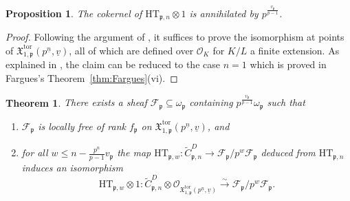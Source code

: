 \documentclass[11pt]{amsart}
\theoremstyle{definition} %
\theoremstyle{plain} %
\newtheorem{theorem}[definition]{Theorem}
\newtheorem{proposition}[definition]{Proposition}
\theoremstyle{remark} %
\newcommand{\cF}{{\mathcal F}}
\newcommand{\cO}{{\mathcal O}}
\newcommand{\frakX}{\mathfrak X}
\newcommand{\frakp}{\mathfrak p}
\newcommand{\HT}{\mathrm{HT}}
\newcommand{\tor}{\mathrm{tor}} %
\begin{document}
\begin{proposition} \label{prop:cokerHT}
    The cokernel of $\HT_{\frakp,n}\otimes 1$
     is annihilated  by $p^\frac{v_\frakp}{p-1}$.
\end{proposition}
\begin{proof}
Following the argument of \cite[Prop.~4.2.2]{AIP_Siegel},
it suffices to prove the isomorphism at points of $\frakX_{1,\frakp}^\tor(p^{\underline{n}},\underline{v})$,
all of which are defined over $\cO_K$ for $K/L$ a finite extension.
As explained in \cite[Prop.~3.2.1]{AIP_Siegel}, the claim can be reduced to the case $n=1$ which is proved in Fargues's Theorem~\ref{thm:Fargues}(vi).
\end{proof}

\begin{theorem}
There exists a sheaf $\cF_\frakp\subseteq \omega_\frakp$  containing $p^{\frac{v_\frakp}{p-1}}\omega_\frakp$ such that
\begin{enumerate}
    \item $\cF_\frakp$ is locally free of rank $f_\frakp$ on $\frakX_{1,\frakp}^\tor(p^{\underline{n}},\underline{v})$, and 
    \item  for all $w\leqslant n-\frac{p^n}{p-1}v_\frakp$ the  map
$\HT_{\frakp,w}\colon \widetilde{C}_{\frakp,n}^{D} \rightarrow \cF_{\frakp}/p^w\cF_{\frakp}$
deduced from $\HT_{\frakp,n}$ induces an isomorphism
\[
\HT_{\frakp,w} \otimes 1 \colon \widetilde{C}_{\frakp,n}^{D}\otimes \cO_{\frakX_{1,\frakp}^\tor(p^{\underline{n}},\underline{v})} \xrightarrow{\sim} \cF_\frakp/p^w\cF_{\frakp}.
\]
\end{enumerate}
\end{theorem}
\end{document}
